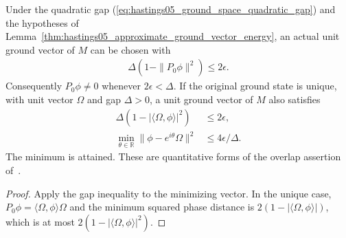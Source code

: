 \begin{lemma}
    \label{thm:hastings05_ground_overlap_norm_error}
    \leanok
    Under the quadratic gap (\ref{eq:hastings05_ground_space_quadratic_gap})
    and the hypotheses of
    Lemma~\ref{thm:hastings05_approximate_ground_vector_energy}, an actual
    unit ground vector of $M$ can be chosen with
    \begin{align}
        \Delta(1-\|P_0\phi\|^2)\le2\epsilon.
        \label{eq:hastings05_ground_overlap_norm_error}
    \end{align}
    Consequently $P_0\phi\ne0$ whenever $2\epsilon<\Delta$.
    If the original ground state is unique, with unit vector $\Omega$
    and gap $\Delta>0$, a unit ground vector of $M$ also satisfies
    \begin{align}
        \Delta(1-|\langle\Omega,\phi\rangle|^2) & \le2\epsilon,        \\
        \min_{\theta\in\mathbb R}
        \|\phi-e^{i\theta}\Omega\|^2            & \le4\epsilon/\Delta.
        \label{eq:hastings05_ground_phase_norm_error}
    \end{align}
    The minimum is attained. These are quantitative forms of the overlap
    assertion of~\cite[lines 362--367]{Hastings2006Solving}.
\end{lemma}
\begin{proof}\leanok
    Apply the gap inequality to the minimizing vector. In the unique case,
    $P_0\phi=\langle\Omega,\phi\rangle\Omega$ and the minimum squared
    phase distance is $2(1-|\langle\Omega,\phi\rangle|)$, which is at most
    $2(1-|\langle\Omega,\phi\rangle|^2)$.
\end{proof}

